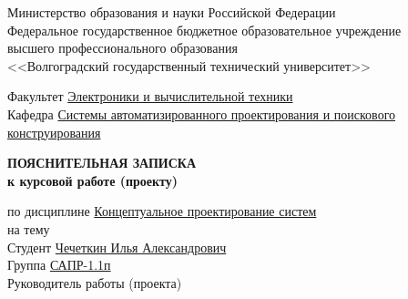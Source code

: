 \begin{titlepage}
    \begin{center}
        Министерство образования и науки Российской Федерации \\
        Федеральное государственное бюджетное образовательное учреждение\\
        высшего профессионального образования\\
        <<Волгоградский государственный технический университет>>\\
    \end{center}
    Факультет \underline{\hspace{1cm}Электроники и вычислительной техники\hspace{4.75cm}}\\
    Кафедра \underline{\hspace{1.4cm}Системы автоматизированного проектирования и поискового\hspace{0.3cm}}\\
    \underline{конструирования\hspace{13.3cm}}
    \vspace{1cm}
    \begin{center}
        \large \MakeUppercase{\textbf{пояснительная записка}} \\
        \normalsize\vspace{-0.2cm}\textbf{к курсовой работе (проекту)}
    \end{center}
    \begin{flushleft}
        по дисциплине \underline{\hspace{1cm}Концептуальное проектирование систем\hspace{3.8cm}}\\
        на тему \underline{\hspace{15.2cm}}\\
        \underline{\hspace{\textwidth}}
        Студент \underline{\hspace{1cm}Чечеткин Илья Александрович\hspace{2cm}} \\
        Группа \underline{\hspace{1cm}САПР-1.1п\hspace{2cm}}\\
        Руководитель работы (проекта) \underline{\hspace{5cm}}
            \hspace{0.5cm} \underline{\hspace{4.2cm}}\\

\end{flushleft}
\end{titlepage}
